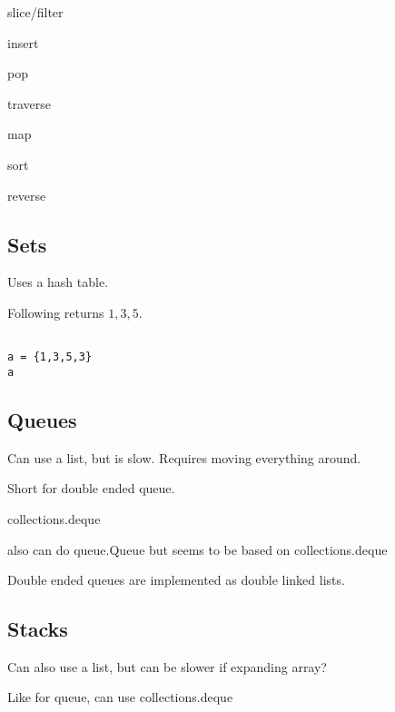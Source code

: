 slice/filter

insert

pop

traverse

map

sort

reverse

\subsection{Sets}

Uses a hash table.

Following returns \(1, 3, 5\).
\begin{verbatim}

a = {1,3,5,3}
a

\end{verbatim}

\subsection{Queues}

Can use a list, but is slow. Requires moving everything around.

Short for double ended queue.

collections.deque

also can do queue.Queue but seems to be based on collections.deque

Double ended queues are implemented as double linked lists.

\subsection{Stacks}

Can also use a list, but can be slower if expanding array?

Like for queue, can use collections.deque

